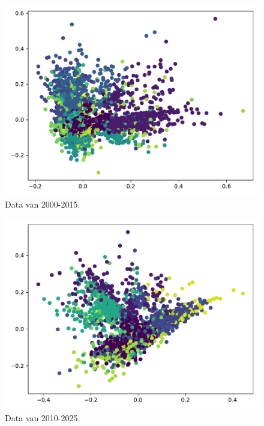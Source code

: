 \documentclass[a4paper,fontsize=11pt]{article}
\begin{document}
\begin{figure}[H]
  \centering
  \includegraphics[width=\textwidth]{pca_2000-2015.pdf}
  \caption{Data van 2000-2015.}
  \label{fig:2000}
\end{figure}

\begin{figure}[H]
  \centering
  \includegraphics[width=\textwidth]{pca_2010-2025.pdf}
  \caption{Data van 2010-2025.}
  \label{fig:2010}
\end{figure}


\appendix
\end{document}
